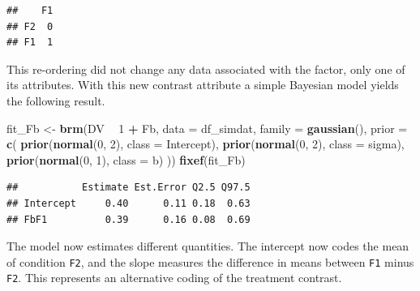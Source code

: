 \documentclass[12pt,]{krantz}
\newenvironment{Shaded}{\begin{snugshade}}{\end{snugshade}}
\newcommand{\KeywordTok}[1]{\textcolor[rgb]{0.13,0.29,0.53}{\textbf{#1}}}
\newcommand{\DataTypeTok}[1]{\textcolor[rgb]{0.13,0.29,0.53}{#1}}
\newcommand{\DecValTok}[1]{\textcolor[rgb]{0.00,0.00,0.81}{#1}}
\newcommand{\StringTok}[1]{\textcolor[rgb]{0.31,0.60,0.02}{#1}}
\newcommand{\OperatorTok}[1]{\textcolor[rgb]{0.81,0.36,0.00}{\textbf{#1}}}
\newcommand{\NormalTok}[1]{#1}
\theoremstyle{definition}
\theoremstyle{definition}
\theoremstyle{definition}
\theoremstyle{remark}
\begin{document}
\begin{Shaded}
\end{Shaded}

\begin{verbatim}
##    F1
## F2  0
## F1  1
\end{verbatim}

\noindent
This re-ordering did not change any data associated with the factor,
only one of its attributes. With this new contrast attribute a simple
Bayesian model yields the following result.

\begin{Shaded}
\begin{Highlighting}[]
\NormalTok{fit_Fb <-}\StringTok{ }\KeywordTok{brm}\NormalTok{(DV }\OperatorTok{~}\StringTok{ }\DecValTok{1} \OperatorTok{+}\StringTok{ }\NormalTok{Fb,}
                 \DataTypeTok{data =}\NormalTok{ df_simdat,}
                 \DataTypeTok{family =} \KeywordTok{gaussian}\NormalTok{(),}
                 \DataTypeTok{prior =} \KeywordTok{c}\NormalTok{(}
                     \KeywordTok{prior}\NormalTok{(}\KeywordTok{normal}\NormalTok{(}\DecValTok{0}\NormalTok{, }\DecValTok{2}\NormalTok{), }\DataTypeTok{class =}\NormalTok{ Intercept),}
                     \KeywordTok{prior}\NormalTok{(}\KeywordTok{normal}\NormalTok{(}\DecValTok{0}\NormalTok{, }\DecValTok{2}\NormalTok{), }\DataTypeTok{class =}\NormalTok{ sigma),}
                     \KeywordTok{prior}\NormalTok{(}\KeywordTok{normal}\NormalTok{(}\DecValTok{0}\NormalTok{, }\DecValTok{1}\NormalTok{), }\DataTypeTok{class =}\NormalTok{ b)}
\NormalTok{                 )) }
\KeywordTok{fixef}\NormalTok{(fit_Fb)}
\end{Highlighting}
\end{Shaded}

\begin{verbatim}
##           Estimate Est.Error Q2.5 Q97.5
## Intercept     0.40      0.11 0.18  0.63
## FbF1          0.39      0.16 0.08  0.69
\end{verbatim}

The model now estimates different quantities. The intercept now codes
the mean of condition \texttt{F2}, and the slope measures the difference
in means between \texttt{F1} minus \texttt{F2}. This represents an
alternative coding of the treatment contrast.
\end{document}

